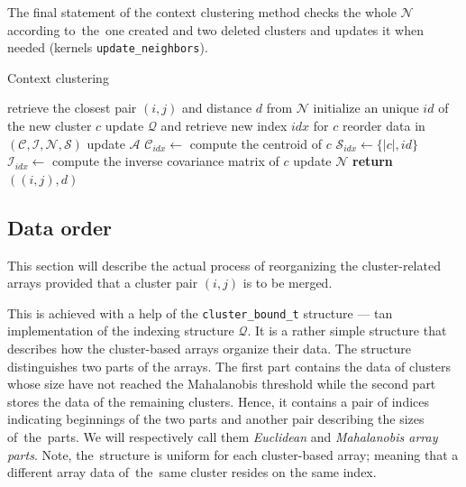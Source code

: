 \begin{description}
	The final statement of the context clustering method checks the whole $\mathcal{N}$  according to~the~one created and two deleted clusters and updates it when needed (kernels \texttt{update\_neighbors}).
	
	\begin{algorithm}
	\caption{Context clustering}
	\label{alg03:context}
	\begin{algorithmic}[1]
		\State retrieve the closest pair $(i,j)$ and distance $d$ from $\mathcal{N}$
		\State initialize an unique $id$ of the new cluster $c$
		\State update $\mathcal{Q}$ and retrieve new index $idx$ for $c$
		\State reorder data in $(\mathcal{C},\mathcal{I},\mathcal{N},\mathcal{S})$
		\State update $\mathcal{A}$
		\State $\mathcal{C}_{idx} \gets$ compute the centroid of $c$
		\State $\mathcal{S}_{idx} \gets \{|c|, id\}$
		\State $\mathcal{I}_{idx} \gets$ compute the inverse covariance matrix of $c$
		\EndIf
		\State update $\mathcal{N}$
		\State \textbf{return} $((i,j),d)$
		\EndProcedure
	\end{algorithmic}
\end{algorithm}

\end{description}


\subsection{Data order}

This section will describe the actual process of reorganizing the cluster-related arrays provided that a cluster pair $(i,j)$ is to be merged.

This is achieved with a help of the \texttt{cluster\_bound\_t} structure --- tan implementation of the indexing structure $\mathcal{Q}$. It is a rather simple structure that describes how the cluster-based arrays organize their data. The structure distinguishes two parts of the arrays. The first part contains the data of clusters whose size have not reached the Mahalanobis threshold while the second part stores the data of the remaining clusters. Hence, it contains a pair of indices indicating beginnings of the two parts and another pair describing the sizes of~the~parts. We will respectively call them \emph{Euclidean} and \emph{Mahalanobis array parts}. Note, the~structure is uniform for each cluster-based array; meaning that a different array data of~the~same cluster resides on the same index.

